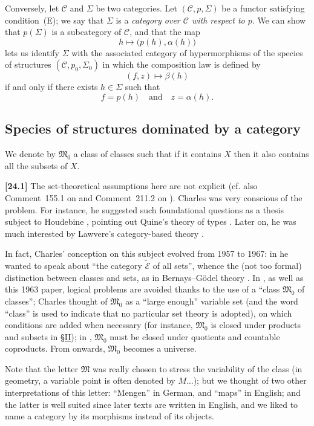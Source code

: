 \documentclass[a4paper,fleqn]{article}
\theoremstyle{plain}
\theoremstyle{definition}
\newenvironment{longcomm}[1]
  {\noindent\textbf{[#1]}\rmfamily}
  {}
\newcommand{\textand}{\quad\text{and}\quad}
\newcommand{\CC}{\mathcal{C}}
\newcommand{\MM}{\mathfrak{M}}
\begin{document}
Conversely, let $\CC$ and $\Sigma$ be two categories.
Let $(\CC,p,\Sigma)$ be a functor satisfying condition~(E);
we say that $\Sigma$ is a \emph{category over $\CC$ with respect to $p$}.
We can show \cite{3a} that $p(\Sigma)$ is a subcategory of $\CC$, and that the map
\[
  h\longmapsto \big(p(h),\alpha(h)\big)
\]
lets us identify $\Sigma$ with the associated category of hypermorphisms of the species of structures $(\CC,p_0,\Sigma_0)$ in which the composition law is defined by
\[
  (f,z) \longmapsto \beta(h)
\]
if and only if there exists $h\in\Sigma$ such that
\[
  f=p(h)
  \textand
  z=\alpha(h).
\]



\subsection{Species of structures dominated by a category}
\label{section:i.3}

We denote by $\MM_0$ a class of classes such that if it contains $X$ then it also contains all the subsets of $X$.

\begin{longcomm}{24.1}
  The set-theoretical assumptions here are not explicit (cf. also Comment~155.1 on \cite{coll66} and Comment~211.2 on \cite{coll100}).
  Charles was very conscious of the problem.
  For instance, he suggested such foundational questions as a thesis subject to Houdebine \cite{comm55}, pointing out Quine's theory of types \cite{comm87}.
  Later on, he was much interested by Lawvere's category-based theory \cite{comm64}.

  In fact, Charles' conception on this subject evolved from 1957 to 1967: in \cite{coll47} he wanted to speak about ``the category $\widetilde{\mathcal{E}}$ of all sets'', whence the (not too formal) distinction between classes and sets, as in Bernays--Gödel theory \cite{comm10}.
  In \cite{coll55}, as well as this 1963 paper, logical problems are avoided thanks to the use of a ``class $\MM_0$ of classes'';
  Charles thought of $\MM_0$ as a ``large enough'' variable set (and the word ``class'' is used to indicate that no particular set theory is adopted), on which conditions are added when necessary (for instance, $\MM_0$ is closed under products and subsets in \hyperref[section:ii]{§II});
  in \cite{coll66,coll100}, $\MM_0$ must be closed under quotients and countable coproducts.
  From \cite{coll109} onwards, $\MM_0$ becomes a universe.

  Note that the letter $\MM$ was really chosen to stress the variability of the class (in geometry, a variable point is often denoted by $M$...);
  but we thought of two other interpretations of this letter: ``Mengen'' in German, and ``maps'' in English;
  and the latter is well suited since later texts are written in English, and we liked to name a category by its morphisms instead of its objects.
\end{longcomm}
\end{document}
